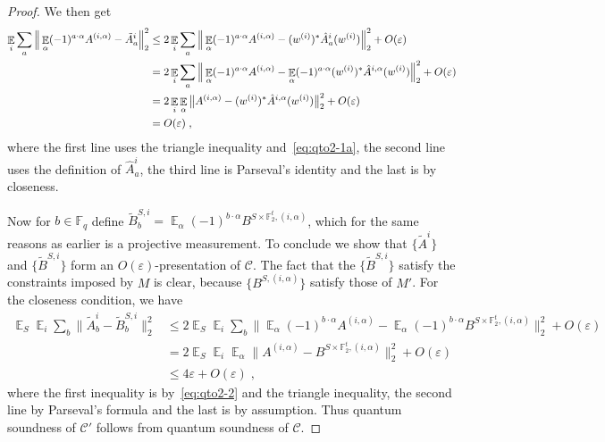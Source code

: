 \documentclass[11pt]{article}
\theoremstyle{definition}
\newcommand{\code}{\mathcal{C}}
\DeclareMathOperator*{\Expectation}{\mathbb{E}}
\newcommand{\Es}[1]{\Expectation_{#1}}
\newcommand{\F}{\ensuremath{\mathbb{F}}}
\newcommand{\eps}{\varepsilon}
\begin{document}
\begin{proof}
We then get
\begin{align}
 \Es{i} \sum_a \Big\| \Es{\alpha} (-1)^{a\cdot \alpha} A^{(i,\alpha)} -  \tilde{A}^i_a \Big\|_2^2 
&\leq  2\Es{i} \sum_a \Big\| \Es{\alpha} (-1)^{a\cdot \alpha} A^{(i,\alpha)} -  (w^{(i)})^* \hat{A}^i_a (w^{(i)}) \Big\|_2^2 + O(\eps)\notag\\
&=  2\Es{i} \sum_a \Big\| \Es{\alpha} (-1)^{a\cdot \alpha} A^{(i,\alpha)} -   \Es{\alpha} (-1)^{a\cdot \alpha} (w^{(i)})^* \hat{A}^{i,\alpha} (w^{(i)}) \Big\|_2^2+ O(\eps) \notag\\
&= 2\Es{i} \Es{\alpha} \big\| A^{(i,\alpha)} -    (w^{(i)})^* \hat{A}^{i,\alpha} (w^{(i)}) \big\|_2^2+ O(\eps)\notag\\
&= O(\eps)\;, \label{eq:qto2-2}
\end{align}
where the first line uses the triangle inequality and~\eqref{eq:qto2-1a}, the second line uses the definition of $\hat{A}^i_a$, the third line is Parseval's identity and the last is by closeness. 

Now for $b\in \F_q$ define $\tilde{B}^{S,i}_b= \Es{\alpha} (-1)^{b\cdot \alpha} B^{S\times \F_2^t,(i,\alpha)}$, which for the same reasons as earlier is a projective measurement. 
To conclude we show that $\{\tilde{A}^{i}\}$ and $\{\tilde{B}^{S,i}\}$ form an $O(\eps)$-presentation of $\code$. The fact that the $\{\tilde{B}^{S,i}\}$ satisfy the constraints imposed by $M$ is clear, because $\{B^{S,(i,\alpha)}\}$ satisfy those of $M'$. For the closeness condition, we have
\begin{align*}
\Es{S}\Es{i} \sum_b \big\| \tilde{A}^i_b - \tilde{B}^{S,i}_b \big\|_2^2
&\leq 2\Es{S}\Es{i} \sum_b \Big\| \Es{\alpha} (-1)^{b\cdot \alpha} {A}^{(i,\alpha)} - \Es{\alpha} (-1)^{b\cdot \alpha} B^{S\times \F_2^t,(i,\alpha)}\Big\|_2^2 + O(\eps)\\
&= 2\Es{S}\Es{i} \Es{\alpha}\big\|  {A}^{(i,\alpha)} -  B^{S\times \F_2^t,(i,\alpha)}\big\|_2^2 + O(\eps)\\
&\leq 4\eps + O(\eps)\;,
\end{align*}
where the first inequality is by~\eqref{eq:qto2-2} and the triangle inequality, the second line by Parseval's formula and the last is by assumption. Thus quantum soundness of $\code'$ follows from quantum soundness of $\code$. 
\end{proof}
\end{document}
